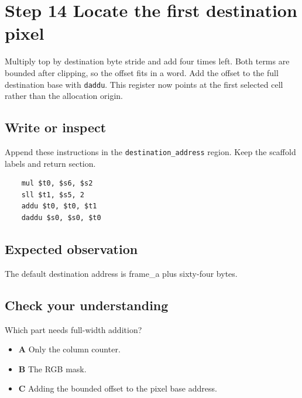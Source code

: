\section{Step 14 Locate the first destination pixel}\label{blit-s14}

Multiply top by destination byte stride and add four times left. Both terms are bounded after clipping, so the offset fits in a word. Add the offset to the full destination base with \texttt{daddu}. This register now points at the first selected cell rather than the allocation origin.

\subsection{Write or inspect}
Append these instructions in the \texttt{destination\_address} region. Keep the scaffold labels and return section.

\begin{verbatim}
    mul $t0, $s6, $s2
    sll $t1, $s5, 2
    addu $t0, $t0, $t1
    daddu $s0, $s0, $t0
\end{verbatim}

\subsection{Expected observation}
The default destination address is frame\_a plus sixty-four bytes.

\subsection{Check your understanding}
Which part needs full-width addition?

\begin{itemize}
  \item \textbf{A} Only the column counter.
  \item \textbf{B} The RGB mask.
  \item \textbf{C} Adding the bounded offset to the pixel base address.
\end{itemize}
